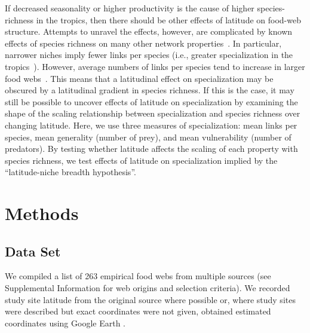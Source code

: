 \documentclass[12pt]{article}
\begin{document}
If decreased seasonality or higher productivity is the cause of higher species-richness in the tropics, then 
there should be other effects of latitude on food-web structure. Attempts to unravel the effects, however,
are complicated by known effects of species richness on many other network properties~\citep{Riede2010}. In particular,
narrower niches imply fewer links per species (i.e., greater specialization in the tropics~\citep{}). However,
average numbers of links per species tend to increase in larger food webs~\citep{Dunne2006,Riede2010}. This means
that a latitudinal effect on specialization may be obscured by a latitudinal gradient in species richness. If this is
the case, it may still be possible to uncover effects of latitude on specialization by examining the shape of the scaling 
relationship between specialization and species richness over changing latitude. Here, we use three measures of specialization:
mean links per species, mean generality (number of prey), and mean vulnerability (number of predators). By testing whether
latitude affects the scaling of each property with species richness, we test effects of latitude on specialization implied by
the ``latitude-niche breadth hypothesis''.



\section*{Methods}

\subsection*{Data Set} 

We compiled a list of 263 empirical food webs from
multiple sources (see Supplemental Information for web origins and selection
criteria). We recorded study site latitude from the original source where
possible or, where study sites were described but exact coordinates were not
given, obtained estimated coordinates using Google Earth \citep{GoogleEarth}.
\end{document}
